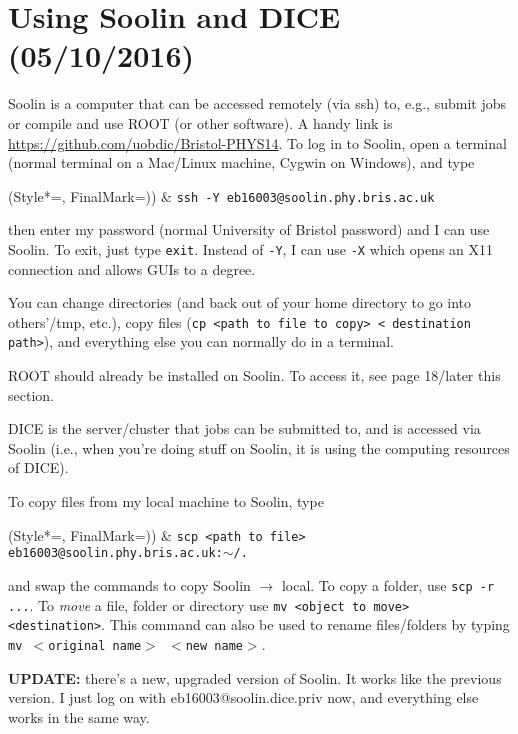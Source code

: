 \newpage
\section{Using Soolin and DICE (05/10/2016)}
\label{sec:usingsoolindice}

Soolin is a computer that can be accessed remotely (via ssh) to, e.g., submit jobs or compile and use ROOT (or other software). A handy link is \url{https://github.com/uobdic/Bristol-PHYS14}. To log in to Soolin, open a terminal (normal terminal on a Mac/Linux machine, Cygwin on Windows), and type

\begin{easylist}
\ListProperties(Style*=, FinalMark={)})
& \verb!ssh -Y eb16003@soolin.phy.bris.ac.uk!
\end{easylist}

then enter my password (normal University of Bristol password) and I can use Soolin. To exit, just type \verb!exit!. Instead of \verb!-Y!, I can use \verb!-X! which opens an X11 connection and allows GUIs to a degree.

You can change directories (and back out of your home directory to go into others'/tmp, etc.), copy files (\verb!cp <path to file to copy> < destination path>!), and everything else you can normally do in a terminal.

ROOT should already be installed on Soolin. To access it, see page 18/later this section.

DICE is the server/cluster that jobs can be submitted to, and is accessed via Soolin (i.e., when you're doing stuff on Soolin, it is using the computing resources of DICE).

To copy files from my local machine to Soolin, type

\begin{easylist}
\ListProperties(Style*=, FinalMark={)})
& \verb!scp <path to file> eb16003@soolin.phy.bris.ac.uk:!$\sim$\verb!/.!
\end{easylist}

and swap the commands to copy Soolin $\rightarrow$ local. To copy a folder, use \verb!scp -r ...!. To \emph{move} a file, folder or directory use \verb!mv <object to move> <destination>!. This command can also be used to rename files/folders by typing \texttt{mv $<$original name$>$ $<$new name$>$}.

\textbf{UPDATE:} there's a new, upgraded version of Soolin. It works like the previous version. I just log on with eb16003@soolin.dice.priv now, and everything else works in the same way.

